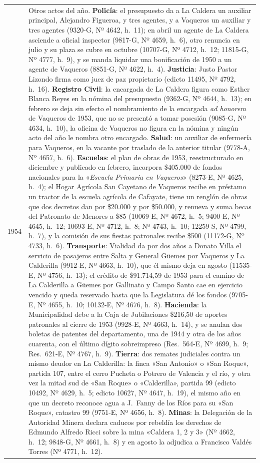 \begin{longtable}{@{}p{2.7cm}p{10.3cm}@{}}
1954 & Otros actos del año. \textbf{Policía}: el presupuesto da a La Caldera un auxiliar principal, Alejandro Figueroa, y tres agentes, y a Vaqueros un auxiliar y tres agentes (9320-G, Nº 4642, h.\ 11); en abril un agente de La Caldera asciende a oficial inspector (9817-G, Nº 4659, h.\ 6), otro renuncia en julio y su plaza se cubre en octubre (10707-G, Nº 4712, h.\ 12; 11815-G, Nº 4777, h.\ 9), y se manda liquidar una bonificación de 1950 a un agente de Vaqueros (8851-G, Nº 4622, h.\ 4). \textbf{Justicia}: Justo Pastor Lizondo firma como juez de paz propietario (edicto 11495, Nº 4792, h.\ 16). \textbf{Registro Civil}: la encargada de La Caldera figura como Esther Blanca Reyes en la nómina del presupuesto (9362-G, Nº 4644, h.\ 13); en febrero se deja sin efecto el nombramiento de la encargada \textit{ad honorem} de Vaqueros de 1953, que no se presentó a tomar posesión (9085-G, Nº 4634, h.\ 10), la oficina de Vaqueros no figura en la nómina y ningún acto del año le nombra otro encargado. \textbf{Salud}: un auxiliar de enfermería para Vaqueros, en la vacante por traslado de la anterior titular (9778-A, Nº 4657, h.\ 6). \textbf{Escuelas}: el plan de obras de 1953, reestructurado en diciembre y publicado en febrero, incorpora \$405.000 de fondos nacionales para la «\textit{Escuela Primaria en Vaqueros}» (8273-E, Nº 4625, h.\ 4); el Hogar Agrícola San Cayetano de Vaqueros recibe en préstamo un tractor de la escuela agrícola de Cafayate, tiene un renglón de obras que dos decretos dan por \$20.000 y por \$50.000, y renueva y suma becas del Patronato de Menores a \$85 (10069-E, Nº 4672, h.\ 5; 9400-E, Nº 4645, h.\ 12; 10693-E, Nº 4712, h.\ 8; Nº 4743, h.\ 10; 12259-S, Nº 4799, h.\ 7), y la comisión de sus fiestas patronales recibe \$500 (11172-G, Nº 4733, h.\ 6). \textbf{Transporte}: Vialidad da por dos años a Donato Villa el servicio de pasajeros entre Salta y General Güemes por Vaqueros y La Calderilla (9912-E, Nº 4663, h.\ 10), que él mismo deja en agosto (11535-E, Nº 4756, h.\ 13); el crédito de \$91.714,59 de 1953 para el camino de La Calderilla a Güemes por Gallinato y Campo Santo cae en ejercicio vencido y queda reservado hasta que la Legislatura dé los fondos (9705-E, Nº 4655, h.\ 10; 10132-E, Nº 4676, h.\ 8). \textbf{Hacienda}: la Municipalidad debe a la Caja de Jubilaciones \$216,50 de aportes patronales al cierre de 1953 (9928-E, Nº 4663, h.\ 14), y se anulan dos boletas de patentes del departamento, una de 1944 y otra de los años cuarenta, con el último dígito sobreimpreso (Res.\ 564-E, Nº 4699, h.\ 9; Res.\ 621-E, Nº 4767, h.\ 9). \textbf{Tierra}: dos remates judiciales contra un mismo deudor en La Calderilla: la finca «San Antonio» o «San Roque», partida 107, entre el cerro Pucheta o Potrero de Valencia y el río, y otra vez la mitad sud de «San Roque» o «Calderilla», partida 99 (edicto 10492, Nº 4629, h.\ 5; edicto 10627, Nº 4647, h.\ 19), el mismo año en que un decreto reconoce agua a J.\ Fanny de los Ríos para su «San Roque», catastro 99 (9751-E, Nº 4656, h.\ 8). \textbf{Minas}: la Delegación de la Autoridad Minera declara caducos por rebeldía los derechos de Edmundo Alfredo Ricci sobre la mina «Caldera 1, 2 y 3» (Nº 4662, h.\ 12; 9848-G, Nº 4661, h.\ 8) y en agosto la adjudica a Francisco Valdés Torres (Nº 4771, h.\ 12). 
\end{longtable}
